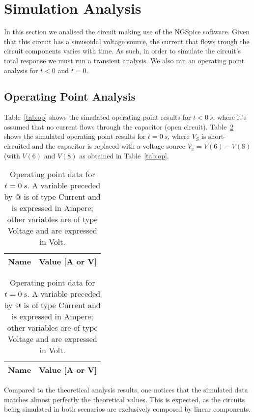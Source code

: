 \section{Simulation Analysis}
\label{sec:simulation}

In this section we analised the circuit making use of the NGSpice software. Given that this circuit has a sinusoidal voltage source, the current that flows trough the circuit components varies with time.
As such, in order to simulate the circuit's total response we must run a transient analysis. We also ran an operating point analysis for $t < 0$ and $t = 0$.

\subsection{Operating Point Analysis}

Table~\ref{tab:op} shows the simulated operating point results for $t<0~s$, where it's assumed that no current flows through the capacitor (open circuit).
Table~\ref{tab:op2} shows the simulated operating point results for $t=0~s$, where $V_S$ is short-circuited and the capacitor is replaced with a voltage source $V_x = V(6) - V(8)$ (with $V(6)$ and $V(8)$ as obtained in Table~\ref{tab:op}.


\begin{table}[h]
	\parbox{.45\linewidth}{
  \centering
  \begin{tabular}{|l|r|}
    \hline    
    {\bf Name} & {\bf Value [A or V]} \\ \hline
    
  \end{tabular}
  \caption{Operating point data for $t<0~s$. A variable preceded by @ is of type Current and is expressed in Ampere; other variables are of type Voltage and are expressed in Volt.}
  \label{tab:op}
}
\hfill
	\parbox{.45\linewidth}{
  \centering
  \begin{tabular}{|l|r|}
    \hline    
    {\bf Name} & {\bf Value [A or V]} \\ \hline
    
  \end{tabular}
  \caption{Operating point data for $t=0~s$. A variable preceded by @ is of type Current and is expressed in Ampere; other variables are of type Voltage and are expressed in Volt.}
  \label{tab:op2}
}	
\end{table}
            

\paragraoh Compared to the theoretical analysis results, one notices that the simulated data matches almost perfectly the theoretical values. This is expected, as the circuits being simulated in both scenarios are exclusively composed by linear components. 


